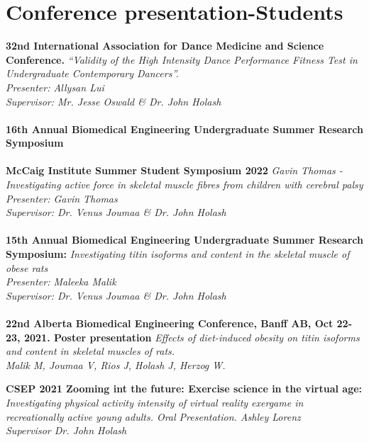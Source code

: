 \documentclass[]{friggeri-cv}
\begin{document}
\section{Conference presentation-Students}
\textbf{32nd International Association for Dance Medicine and Science Conference.} \emph{{“Validity of the High Intensity Dance Performance Fitness Test in Undergraduate Contemporary Dancers”.}\\
{Presenter: Allysan Lui}\\
{Supervisor: Mr. Jesse Oswald \& Dr. John Holash}}\\
\\
\textbf{16th Annual Biomedical Engineering Undergraduate Summer Research Symposium } \\
\\
\textbf{McCaig Institute Summer Student Symposium 2022 }\emph{{Gavin Thomas - Investigating active force in skeletal muscle fibres from children with cerebral palsy}\\
{Presenter: Gavin Thomas}\\
{Supervisor: Dr. Venus Joumaa \& Dr. John Holash}}\\
\\
\textbf{15th Annual Biomedical Engineering Undergraduate Summer Research Symposium:}\emph{ Investigating titin isoforms and content in the skeletal muscle of obese rats \\
Presenter: Maleeka Malik \\
Supervisor: Dr. Venus Joumaa \& Dr. John Holash}\\
\\
\textbf{22nd Alberta Biomedical Engineering Conference, Banff AB, Oct 22-23, 2021. Poster presentation}
\emph{Effects of diet-induced obesity on titin isoforms and content in skeletal muscles of rats. \\
Malik M, Joumaa V, Rios J, Holash J, Herzog W.}


\textbf{CSEP 2021 Zooming int the future: Exercise science in the virtual age:}\emph{{ Investigating physical activity intensity of virtual reality exergame in recreationally active young adults. Oral Presentation.}{ Ashley Lorenz }\\
Supervisor Dr. John Holash}\\
\\
\end{document}
